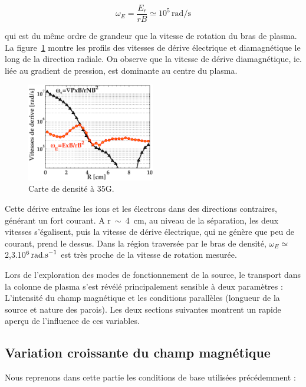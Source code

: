 \begin{refsection}
\begin{equation}
\omega_E=\frac{E_r}{rB}\simeq10^5\,\text{rad/s} 
\end{equation}

qui est du même ordre de grandeur que la vitesse de rotation du bras de plasma.
La figure~\ref{4-CybeleVitessesDerive} montre les profils des vitesses
de dérive électrique et diamagnétique le long de la direction radiale. On
observe que la vitesse de dérive diamagnétique, ie. liée au gradient de pression, est dominante au centre du
plasma. 

\begin{figure}[!htbp]
\centering
\includegraphics[width=0.5\textwidth]{figures/4-CybeleProfileVitessesDerive.eps}
{\caption{Carte de densité à 35G.}
\label{4-CybeleVitessesDerive}}
\end{figure}

Cette dérive entraîne les ions et les électrons dans des directions
contraires, générant un fort courant. A r~$\sim$~4~cm, au niveau de la
séparation, les deux vitesses s'égalisent, puis la vitesse de dérive électrique, qui ne
génère que peu de courant, prend le dessus. Dans la région traversée par le bras
de densité, $\omega_E\simeq$ 2,3.10$^{{6}}\,\text{rad.s}^{{-1}}$
est très proche de la vitesse de rotation mesurée.

Lors de l'exploration des modes de fonctionnement de la source, le transport
dans la colonne de plasma s'est révélé principalement sensible à deux
paramètres : L'intensité du champ magnétique et les conditions parallèles 
(longueur de la source et nature des parois). Les deux sections suivantes
montrent un rapide aperçu de l'influence de ces variables.

\subsection{Variation croissante du champ magnétique}
Nous reprenons dans cette partie les conditions de base utilisées précédemment :


\end{refsection}
